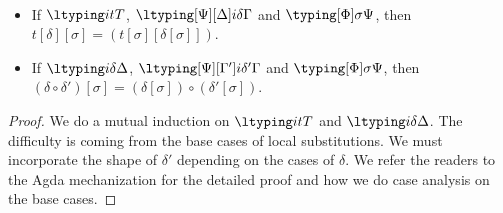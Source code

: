 \begin{lemma} $ $
  \begin{itemize}
  \item If $\ltyping i t T$, $\ltyping[\Psi][\Delta] i \delta \Gamma$ and
    $\typing[\Phi] \sigma \Psi$, then
    $t[\delta][\sigma] = (t[\sigma][\delta[\sigma]])$.
  \item If $\ltyping i \delta \Delta$, $\ltyping[\Psi][\Gamma'] i {\delta'} \Gamma$
    and $\typing[\Phi] \sigma \Psi$, then
    $(\delta \circ \delta') [\sigma] = (\delta[\sigma]) \circ (\delta'[\sigma])$.
  \end{itemize}
\end{lemma}
\begin{proof}
  We do a mutual induction on $\ltyping i t T$ and $\ltyping i \delta \Delta$. %
  The difficulty is coming from the base cases of local substitutions. %
  We must incorporate the shape of $\delta'$ depending on the cases of $\delta$. %
  We refer the readers to the Agda mechanization for the detailed proof and how we do
  case analysis on the base cases. 
  

\end{proof}
